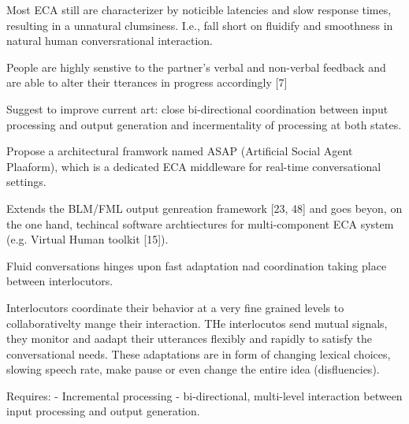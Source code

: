 Most ECA still are characterizer by  noticible latencies and slow response times, resulting in a unnatural clumsiness. I.e., fall short on fluidify and smoothness in natural human conversrational interaction.


People are highly senstive to the partner's verbal and non-verbal feedback and are able to alter their tterances in progress accordingly [7]

Suggest to improve current art: close bi-directional coordination between input processing and output generation and incermentality of processing at both states.

Propose a architectural framwork named ASAP (Artificial Social Agent Plaaform), which is a dedicated ECA middleware for real-time conversational settings.

Extends the BLM/FML output genreation framework [23, 48] and goes beyon, on the one hand, techincal software archtiectures for multi-component ECA system (e.g. Virtual Human toolkit [15]).

Fluid conversations hinges upon fast adaptation nad coordination taking place between interlocutors.

Interlocutors coordinate their behavior at a very fine grained levels to collaborativelty mange their interaction. THe interlocutos send mutual signals, they monitor and aadapt their utterances  flexibly and rapidly to satisfy the conversational needs. These adaptations are in form of changing lexical choices, slowing speech rate, make pause or even change the entire idea (disfluencies).

Requires: 
- Incremental processing
- bi-directional, multi-level interaction between input processing and output generation.


